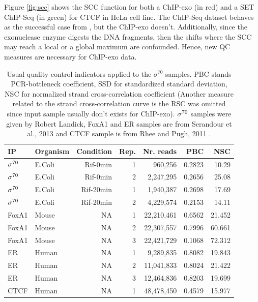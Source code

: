 \documentclass[11pt]{article}\usepackage[]{graphicx}\usepackage[]{color}
\begin{document}
Figure \ref{fig:scc} shows the SCC function for both a ChIP-exo (in
red) and a SET ChIP-Seq (in green) for CTCF in HeLa cell line. The
ChIP-Seq dataset behaves as the successful case from \cite{encode_qc},
but the ChIP-exo doesn't. Additionally, since the exonuclease enzyme
digests the DNA fragments, then the shifts where the SCC may reach a
local or a global maximum are confounded. Hence, new QC measures are
necessary for ChIP-exo data.

\begin{table}[H]
  \centering
  \caption{Usual quality control indicators applied to the $\sigma^{70}$ samples. PBC stands PCR-bottleneck coefficient, SSD for standardized standard deviation, NSC for normalized strand cross-correlation coefficient (Another measure related to the strand cross-correlation curve is the RSC was omitted since input sample usually don't exists for ChIP-exo). $\sigma^{70}$ samples were given by Robert Landick, FoxA1 and ER samples are from Serandour et al., 2013 \cite{exoillumina} and CTCF sample is from Rhee and Pugh, 2011 \cite{exo1}.}

\begin{tabular}{l|l|r|r|r|r|r}
\hline\hline
IP & Organism  &Condition & Rep. & Nr. reads & PBC &  NSC  \\
\hline\hline
$\sigma^{70}$ & E.Coli & Rif-0min & 1 & 960,256 & 0.2823 &   10.29 \\
\hline
$\sigma^{70}$ &  E.Coli & Rif-0min & 2 & 2,247,295 & 0.2656 &  25.08  \\
\hline
$\sigma^{70}$ &  E.Coli & Rif-20min & 1 & 1,940,387 & 0.2698 &  17.69  \\
\hline
$\sigma^{70}$ &  E.Coli & Rif-20min & 2 & 4,229,574 & 0.2153 &   14.11 \\
\hline
FoxA1 &  Mouse &  NA & 1 & 22,210,461 & 0.6562 & 21.452 \\
\hline
FoxA1 &  Mouse &  NA & 2 & 22,307,557 & 0.7996 & 60.661 \\
\hline
FoxA1 &  Mouse &  NA & 3 & 22,421,729 & 0.1068 & 72.312 \\
\hline
ER & Human & NA & 1 & 9,289,835 & 0.8082 & 19.843 \\
\hline
ER & Human & NA & 2 & 11,041,833 & 0.8024 & 21.422 \\
\hline
ER & Human & NA & 3 & 12,464,836 & 0.8203 & 19.699 \\
\hline
CTCF & Human & NA & 1 &   48,478,450 & 0.4579 & 15.977 \\
\hline
\end{tabular}  
  \label{tab:qcbase}
\end{table}
\end{document}
